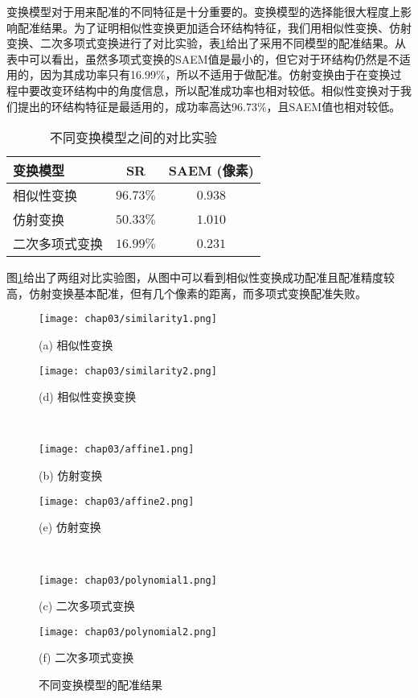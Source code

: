 变换模型对于用来配准的不同特征是十分重要的。变换模型的选择能很大程度上影响配准结果。为了证明相似性变换更加适合环结构特征，我们用相似性变换、仿射变换、二次多项式变换进行了对比实验，表\ref{tab:models}给出了采用不同模型的配准结果。从表中可以看出，虽然多项式变换的SAEM值是最小的，但它对于环结构仍然是不适用的，因为其成功率只有16.99\%，所以不适用于做配准。仿射变换由于在变换过程中要改变环结构中的角度信息，所以配准成功率也相对较低。相似性变换对于我们提出的环结构特征是最适用的，成功率高达96.73\%，且SAEM值也相对较低。
\begin{table}[!ht]
\caption{不同变换模型之间的对比实验}
\centering
\begin{tabular}{lcc}
\toprule
变换模型 & SR  & SAEM (像素)\\
\midrule
相似性变换 & $\mathbf{96.73\%}$ & $\mathbf{0.938}$ \\
仿射变换 & $50.33\%$ & $1.010$              \\
二次多项式变换 & $16.99\%$ & $0.231$\\
\bottomrule
\end{tabular}
\label{tab:models}
\end{table}

图\ref{fig:transform-fig}给出了两组对比实验图，从图中可以看到相似性变换成功配准且配准精度较高，仿射变换基本配准，但有几个像素的距离，而多项式变换配准失败。
\begin{figure}[!ht]
\centering

\begin{minipage}[b]{0.48\textwidth} 
      \centering 
      \texttt{[image: chap03/similarity1.png]}
        \centerline{(a) 相似性变换}\medskip
\end{minipage}
  \begin{minipage}[b]{0.48\textwidth}
    \centering
    \texttt{[image: chap03/similarity2.png]}
      \centerline{(d) 相似性变换变换}\medskip
  \end{minipage}
\\
  \begin{minipage}[b]{0.48\textwidth}
    \centering
    \texttt{[image: chap03/affine1.png]}
      \centerline{(b) 仿射变换}\medskip
  \end{minipage}
 \begin{minipage}[b]{0.48\textwidth}
    \centering
      \texttt{[image: chap03/affine2.png]}
        \centerline{(e) 仿射变换}\medskip
    \end{minipage}
\\
\begin{minipage}[b]{0.48\textwidth}
	\centering
      \texttt{[image: chap03/polynomial1.png]}
        \centerline{(c) 二次多项式变换}\medskip
    \end{minipage}
  \begin{minipage}[b]{0.48\textwidth}
    \centering
    \texttt{[image: chap03/polynomial2.png]}
      \centerline{(f) 二次多项式变换}\medskip
  \end{minipage}
\caption{不同变换模型的配准结果}
\label{fig:transform-fig}
\end{figure}

